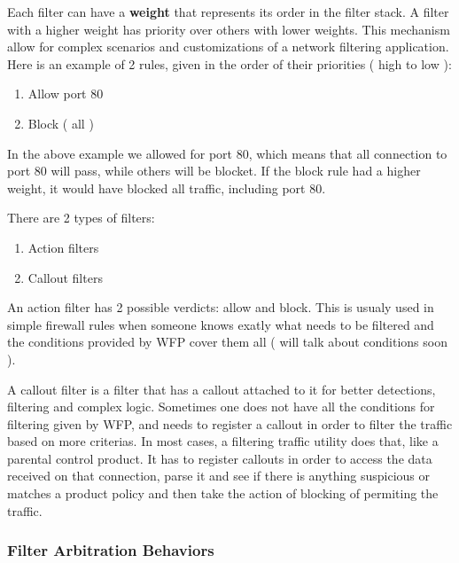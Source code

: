 \vspace{5mm}

Each filter can have a \textbf{weight} that represents its order in the filter stack. A filter with a higher weight has priority over others with lower weights. This mechanism allow for complex scenarios and customizations of a network filtering application.
Here is an example of 2 rules, given in the order of their priorities ( high to low ):
\begin{enumerate}
\item Allow port 80
\item Block ( all )
\end{enumerate}

\vspace{5mm}

In the above example we allowed for port 80, which means that all connection to port 80 will pass, while others will be blocket. If the block rule had a higher weight, it would have blocked all traffic, including port 80.

\vspace{5mm}

There are 2 types of filters:
\begin{enumerate}
\item Action filters
\item Callout filters
\end{enumerate}

\vspace{5mm}

An action filter has 2 possible verdicts: allow and block. This is usualy used in simple firewall rules when someone knows exatly what needs to be filtered and the conditions provided by WFP cover them all ( will talk about conditions soon ).
\vspace{5mm}

A callout filter is a filter that has a callout attached to it for better detections, filtering and complex logic. Sometimes one does not have all the conditions for filtering given by WFP, and needs to register a callout in order to filter the traffic based on more criterias.  In most cases, a filtering traffic utility does that, like a parental control product. It has to register callouts in order to access the data received on that connection, parse it and see if there is anything suspicious or matches a product policy and then take the action of blocking of permiting the traffic. 

\subsubsection{Filter Arbitration Behaviors}

